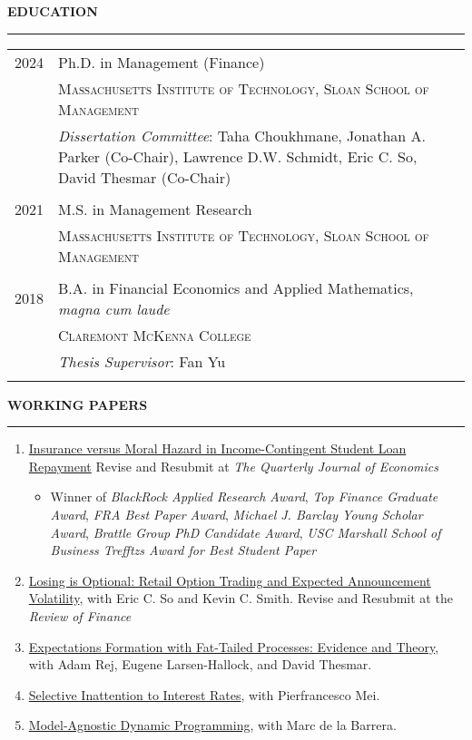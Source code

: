 \documentclass[a4paper, 10pt]{article}
\newcounter{mycounter}
\newcommand{\cvsec}[1]
{
	\needspace{2\baselineskip}
	\noindent \textbf{#1}
	
	\vspace{2pt}
	
	\hrule
	
	\bigskip
}
\newcommand{\cvitem}[2]{#1 & #2 \\ & \\}
\newenvironment{cvchrono}[1]
{
	\cvsec{#1}
	\begin{tabu} to \linewidth {X[1,l]X[6,l]} 
}
{
	\end{tabu}
}
\newenvironment{cvcontinue}[1]
{
	\cvsec{#1}
	\begin{enumerate}
		\setcounter{enumi}{\themycounter}
	}
	{
	\setcounter{mycounter}{\theenumi}
	\end{enumerate}
}
\begin{document}
\begin{cvchrono}{EDUCATION}
	\cvitem{2024}{Ph.D. in Management (Finance) \\
		& \textsc{Massachusetts Institute of Technology, Sloan School of Management} \\
		& \emph{Dissertation Committee}: Taha Choukhmane, Jonathan A. Parker (Co-Chair), Lawrence D.W. Schmidt, Eric C. So, David Thesmar (Co-Chair)
		} 
	\cvitem{2021}{M.S. in Management Research \\
		& \textsc{Massachusetts Institute of Technology, Sloan School of Management}
		} 
	\cvitem{2018}{B.A. in Financial Economics and Applied Mathematics, \emph{magna cum laude} \\
		& \textsc{Claremont McKenna College} \\
		& \emph{Thesis Supervisor}: Fan Yu
		}
\end{cvchrono}

\begin{cvcontinue}{WORKING PAPERS}
	\item \href{https://www.timdesilva.me/files/papers/jmp_deSilva.pdf}{Insurance versus Moral Hazard in Income-Contingent Student Loan Repayment} \newline Revise and Resubmit at \emph{The Quarterly Journal of Economics}
	\begin{itemize}
		\item Winner of \emph{BlackRock Applied Research Award}, \emph{Top Finance Graduate Award}, \emph{FRA Best Paper Award}, \emph{Michael J. Barclay Young Scholar Award}, \emph{Brattle Group PhD Candidate Award}, \emph{USC Marshall School of Business Trefftzs Award for Best Student Paper}
	\end{itemize}
	\item \href{https://www.timdesilva.me/files/papers/losing_optional.pdf}{Losing is Optional: Retail Option Trading and Expected Announcement Volatility}, with Eric C. So and Kevin C. Smith.  \newline Revise and Resubmit at the \emph{Review of Finance}
	\item \href{https://www.timdesilva.me/files/papers/fat_tails.pdf}{Expectations Formation with Fat-Tailed Processes: Evidence and Theory}, with Adam Rej, Eugene Larsen-Hallock, and David Thesmar.
	\item \href{https://www.timdesilva.me/files/papers/si.pdf}{Selective Inattention to Interest Rates}, with Pierfrancesco Mei.
	\item \href{https://www.timdesilva.me/files/papers/agnostic_dp.pdf}{Model-Agnostic Dynamic Programming}, with Marc de la Barrera.%
\end{cvcontinue}
\end{document}
